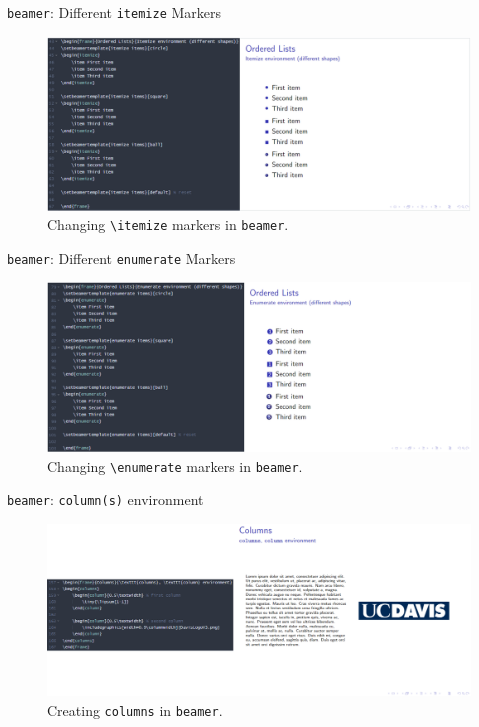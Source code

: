 \documentclass{beamer}
\begin{document}
{  \begin{frame}{\texttt{beamer}: Different \texttt{itemize} Markers}
    \begin{figure}
      \includegraphics[width=\linewidth]{day03-06E-beameritemize.png}
      \caption{Changing \texttt{\textbackslash itemize} markers in \texttt{beamer}.}
      \label{fig:day03-06E-beameritemize}
    \end{figure}
  \end{frame}

  \begin{frame}{\texttt{beamer}: Different \texttt{enumerate} Markers}
    \begin{figure}
      \includegraphics[width=\linewidth]{day03-06F-beamerenumerate.png}
      \caption{Changing \texttt{\textbackslash enumerate} markers in \texttt{beamer}.}
      \label{fig:day03-06F-beamerenumerate}
    \end{figure}
  \end{frame}

  \begin{frame}{\texttt{beamer}: \texttt{column(s)} environment}
    \begin{figure}
      \includegraphics[width=\linewidth]{day03-06G-beamercolumns.png}
      \caption{Creating \texttt{columns} in \texttt{beamer}.}
      \label{fig:day03-06G-beamercolumns}
    \end{figure}
  \end{frame}

}
\end{document}

